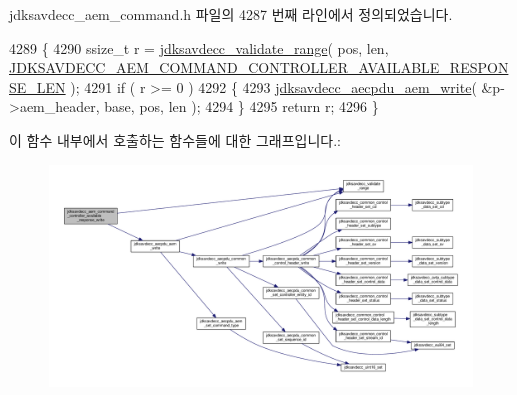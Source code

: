 jdksavdecc\+\_\+aem\+\_\+command.\+h 파일의 4287 번째 라인에서 정의되었습니다.


\begin{DoxyCode}
4289 \{
4290     ssize\_t r = \hyperlink{group__util_ga9c02bdfe76c69163647c3196db7a73a1}{jdksavdecc\_validate\_range}( pos, len, 
      \hyperlink{group__command__controller__available__response_ga98b123879ee62947fd3e0daf599268fb}{JDKSAVDECC\_AEM\_COMMAND\_CONTROLLER\_AVAILABLE\_RESPONSE\_LEN}
       );
4291     \textcolor{keywordflow}{if} ( r >= 0 )
4292     \{
4293         \hyperlink{group__aecpdu__aem_gad658e55771cce77cecf7aae91e1dcbc5}{jdksavdecc\_aecpdu\_aem\_write}( &p->aem\_header, base, pos, len );
4294     \}
4295     \textcolor{keywordflow}{return} r;
4296 \}
\end{DoxyCode}


이 함수 내부에서 호출하는 함수들에 대한 그래프입니다.\+:
\nopagebreak
\begin{figure}[H]
\begin{center}
\leavevmode
\includegraphics[width=350pt]{group__command__controller__available__response_gaf98aac9108a634dc0ac738e970e4ce19_cgraph}
\end{center}
\end{figure}


